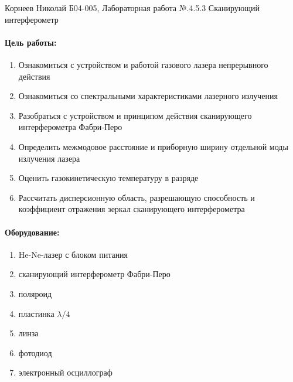 \documentclass[a4paper,12pt]{article}
\author{Бичина Марина 
группа Б04-005 1 курса ФЭФМ}
\title{}
\date{}
\begin{document}

\begin{center}
\begin{Large}
{Корнеев Николай Б04-005, Лабораторная работа №.4.5.3 Сканирующий интерферометр}
\end{Large}
\end{center}
\paragraph{Цель работы:} 
\begin{enumerate}
\itemsep0em
\item Ознакомиться с устройством и работой газового лазера непрерывного действия
\item Ознакомиться со спектральными характеристиками лазерного излучения
\item Разобраться с устройством и принципом действия сканирующего интерферометра Фабри-Перо
\item Определить  межмодовое расстояние и приборную ширину отдельной моды излучения лазера
\item Оценить газокинетическую температуру в разряде
\item Рассчитать дисперсионную область, разрешающую способность и коэффициент отражения зеркал сканирующего интерферометра 
\end{enumerate}
\paragraph{Оборудование:}
\begin{enumerate}
\itemsep0em
\item He-Ne-лазер с блоком питания
\item сканирующий интерферометр Фабри-Перо
\item поляроид
\item пластинка $\lambda/4$
\item линза
\item фотодиод
\item электронный осциллограф
\end{enumerate}
\end{document}
